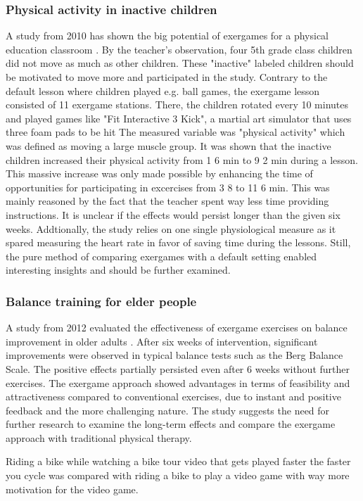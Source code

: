 \subsubsection{Physical activity in inactive children}
A study from 2010 has shown the big potential of exergames for a physical education classroom \cite{fogel2010effects}. By the teacher's observation, four 5th grade class children did not move as much as other children. These "inactive" labeled children should be motivated to move more and participated in the study. 
Contrary to the default lesson where children played e.g. ball games, the exergame lesson consisted of 11 exergame stations. There, the children rotated every 10 minutes and played games like "Fit Interactive 3 Kick", a martial art simulator that uses three foam pads to be hit 
The measured variable was "physical activity" which was defined as moving a large muscle group. It was shown that the inactive children increased their physical activity from 1 6 min to 9 2 min during a lesson. This massive increase was only made possible by enhancing the time of opportunities for participating in excercises from 3 8 to 11 6 min. This was mainly reasoned by the fact that the teacher spent way less time providing instructions. 
It is unclear if the effects would persist longer than the given six weeks. Addtionally, the study relies on one single physiological measure as it spared measuring the heart rate in favor of saving time during the lessons. Still, the pure method of comparing exergames with a default setting enabled interesting insights and should be further examined.

\subsubsection{Balance training for elder people}
A study from 2012 evaluated the effectiveness of exergame exercises on balance improvement in older adults \cite{lai2013effects}. After six weeks of intervention, significant improvements were observed in typical balance tests such as the Berg Balance Scale. The positive effects partially persisted even after 6 weeks without further exercises. The exergame approach showed advantages in terms of feasibility and attractiveness compared to conventional exercises, due to instant and positive feedback and the more challenging nature. The study suggests the need for further research to examine the long-term effects and compare the exergame approach with traditional physical therapy.

Riding a bike while watching a bike tour video that gets played faster the faster you cycle was compared with riding a bike to play a video game with way more motivation for the video game. \cite{hardy2011adoption}

